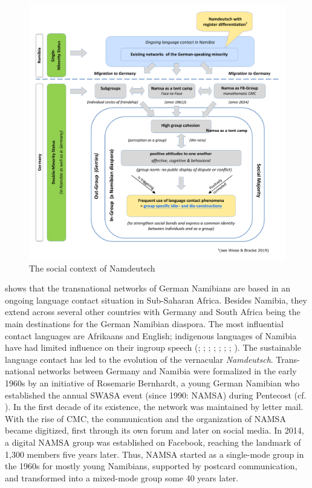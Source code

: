 \documentclass[output=paper]{langsci/langscibook}
\begin{document}
  
 

\begin{figure}
\includegraphics[width=\textwidth]{figures/radkefig1-carla.pdf}
\caption{The social context of Namdeutsch}
\label{fig:radke:1}
\end{figure}  

\figref{
} shows that the transnational networks of German Namibians are based in an ongoing language contact situation in Sub-Saharan Africa. Besides Namibia, they extend across several other countries with Germany and South Africa being the main destinations for the German Namibian diaspora. The most influential contact languages are Afrikaans and English; indigenous languages of Namibia have had limited influence on their ingroup speech (\citealt{bohm_deutsch_2003}; \citealt{duck_namibia_2018}; \citealt{kellermeier-rehbein_namslang_2015, kellermeier-rehbein_sprache_2016}; \citealt{nockler_sprachmischung_1963}; \citealt{putz_sudwesterdeutsch_1991}; \citealt{wiese_deutsch_2014, wiese_german_2017, wiese_registerdifferenzierung_2021}; \citealt{zimmer_linguisticvar_toappear}; \citealt{zimmer_korpus_2020}). The sustainable language contact has led to the evolution of the vernacular \textit{Namdeutsch}. Trans-national networks between Germany and Namibia were formalized in the early 1960s by an initiative of Rosemarie Bernhardt, a young German Namibian who established the annual SWASA event (since 1990: NAMSA) during Pentecost (cf. \citealt{radke_afrikaans_2019a}). In the first decade of its existence, the network was maintained by letter mail. With the rise of CMC, the communication and the organization of NAMSA became digitized, first through its own forum and later on social media. In 2014, a digital NAMSA group was established on Facebook, reaching the landmark of 1,300 members five years later. Thus, NAMSA started as a single-mode group in the 1960s for mostly young Namibians, supported by postcard communication, and transformed into a mixed-mode group some 40 years later. 
\end{document}
